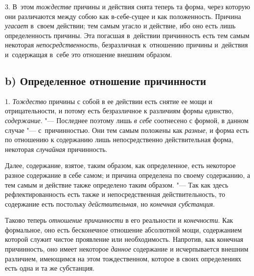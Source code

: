 3. В~этом {\em тождестве} причины и действия снята теперь та форма, через
которую они различаются между собою как в-себе-сущее и как положенность.
Причина {\em угасает} в~своем действии; тем самым угасло и действие, ибо оно
есть лишь определенность причины. Эта погасшая в~действии причинность есть тем
самым некоторая {\em непосредственность}, безразличная к~отношению причины
и~действия и~содержащая в~себе это отношение внешним образом.

\subsection%
[b) Определенное отношение причинности]%
{b) Определенное отношение причинности}

1. {\em Тождество} причины с собой в ее действии есть снятие ее мощи и
отрицательности, и потому есть безразличное к различиям формы единство,
{\em содержание}. "--- Последнее поэтому лишь {\em в себе} соотнесено с формой,
в данном случае "--- с~причинностью. Они тем самым положены как {\em разные}, и
форма есть по отношению к содержанию лишь непосредственно действительная форма,
некоторая {\em случайная} причинность.

Далее, содержание, взятое, таким образом, как определенное, есть некоторое
разное содержание в себе самом; и причина определена по своему содержанию,
а тем самым и действие также определено таким образом. "--- Так как здесь
рефлектированность есть также и непосредственная действительность, то
содержание есть постольку {\em действительная}, но {\em конечная субстанция}.

Таково теперь {\em отношение причинности} в его реальности и {\em конечности}.
Как формальное, оно есть бесконечное отношение абсолютной мощи, содержанием
которой служит чистое проявление или необходимость. Напротив, как конечная
причинность, оно имеет некоторое {\em данное} содержание и исчерпывается
внешним различием, имеющимся на этом тождественном, которое в своих
определениях есть одна и та же субстанция.

